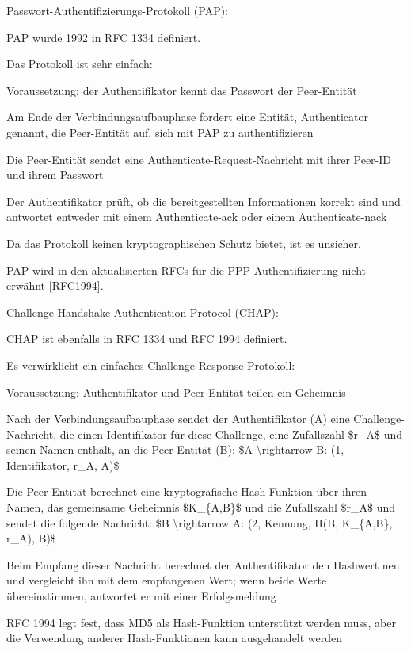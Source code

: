 \documentclass[a4paper]{article}
\begin{document}
\begin{multicols}{3}
      \begin{itemize*}
            \item Passwort-Authentifizierungs-Protokoll (PAP):
            \begin{itemize*}
                  \item PAP wurde 1992 in RFC 1334 definiert.
                  \item Das Protokoll ist sehr einfach:
                  \begin{itemize*} \item Voraussetzung: der Authentifikator kennt das Passwort der Peer-Entität \item Am Ende der Verbindungsaufbauphase fordert eine Entität, Authenticator genannt, die Peer-Entität auf, sich mit PAP zu authentifizieren \item Die Peer-Entität sendet eine Authenticate-Request-Nachricht mit ihrer Peer-ID und ihrem Passwort \item Der Authentifikator prüft, ob die bereitgestellten Informationen korrekt sind und antwortet entweder mit einem Authenticate-ack oder einem Authenticate-nack \end{itemize*}
                  \item Da das Protokoll keinen kryptographischen Schutz bietet, ist es unsicher.
                  \item PAP wird in den aktualisierten RFCs für die PPP-Authentifizierung nicht erwähnt {[}RFC1994{]}.
            \end{itemize*}
            \item Challenge Handshake Authentication Protocol (CHAP):
            \begin{itemize*}
                  \item CHAP ist ebenfalls in RFC 1334 und RFC 1994 definiert.
                  \item Es verwirklicht ein einfaches Challenge-Response-Protokoll:
                  \begin{itemize*} \item Voraussetzung: Authentifikator und Peer-Entität teilen ein Geheimnis \item Nach der Verbindungsaufbauphase sendet der Authentifikator (A) eine Challenge-Nachricht, die einen Identifikator für diese Challenge, eine Zufallszahl \$r\_A\$ und seinen Namen enthält, an die Peer-Entität (B): \$A \textbackslash rightarrow B: (1, Identifikator, r\_A, A)\$ \item Die Peer-Entität berechnet eine kryptografische Hash-Funktion über ihren Namen, das gemeinsame Geheimnis \$K\_\{A,B\}\$ und die Zufallszahl \$r\_A\$ und sendet die folgende Nachricht: \$B \textbackslash rightarrow A: (2, Kennung, H(B, K\_\{A,B\}, r\_A), B)\$ \item Beim Empfang dieser Nachricht berechnet der Authentifikator den Hashwert neu und vergleicht ihn mit dem empfangenen Wert; wenn beide Werte übereinstimmen, antwortet er mit einer Erfolgsmeldung \item RFC 1994 legt fest, dass MD5 als Hash-Funktion unterstützt werden muss, aber die Verwendung anderer Hash-Funktionen kann ausgehandelt werden \end{itemize*}

\end{itemize*}
\end{itemize*}
\end{multicols}
\end{document}
